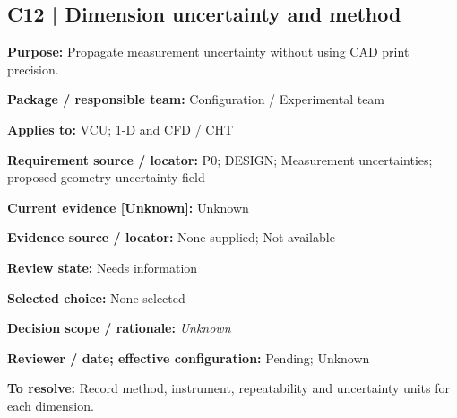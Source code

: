 \documentclass[11pt]{article}
\begin{document}
\par\noindent\begin{minipage}{\textwidth}\small\setlength{\parskip}{2pt}
\subsection*{C12 | Dimension uncertainty and method}
\textbf{Purpose:} Propagate measurement uncertainty without using CAD print precision.\par
\textbf{Package / responsible team:} Configuration / Experimental team\par
\textbf{Applies to:} VCU; 1-D and CFD / CHT\par
\textbf{Requirement source / locator:} P0; DESIGN; Measurement uncertainties; proposed geometry uncertainty field\par
\textbf{Current evidence [Unknown]:} Unknown\par
\textbf{Evidence source / locator:} None supplied; Not available\par
\textbf{Review state:} Needs information\par
\textbf{Selected choice:} None selected\par
\textbf{Decision scope / rationale:} \textit{Unknown}\par
\textbf{Reviewer / date; effective configuration:} Pending; Unknown\par
\textbf{To resolve:} Record method, instrument, repeatability and uncertainty units for each dimension.\par
\end{minipage}\par\vspace{5pt}
\end{document}
